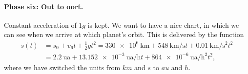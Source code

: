 \documentclass[10pt]{article}
\numberwithin{equation}{section}
\begin{document}
	\paragraph{Phase six: Out to oort.}
	
	Constant acceleration of $1 g$ is kept. We want to have a nice chart, in which we can see when we arrive at which planet's orbit. This is delivered by the function
	\begin{equation} \begin{aligned}
		s(t) & = s_0 + v_6 t + \frac{1}{2} g t^2
		= \SI{330e+6}{\km} + \SI{548}{\km\per\s} t + \SI{0.01}{\km\per\s\squared} t^2 \\
		& = \SI{2.2}{\astronomicalunit} + \SI{13.152e-3}{\astronomicalunit\per\hour} t
			+ \SI{864e-6}{\astronomicalunit\per\hour\squared} t^2, \end{aligned} \end{equation}
	where we have switched the units from $km$ and $s$ to $au$ and $h$.
	
\end{document}
